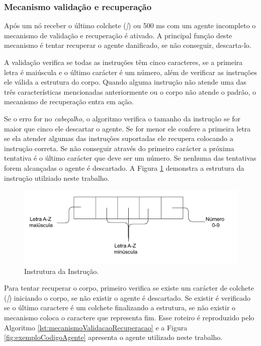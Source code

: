 \subsubsection{Mecanismo validação e recuperação}

Após um nó receber o último colchete (\emph{]}) ou 500 ms com um agente incompleto o mecanismo de validação e recuperação é ativado. A principal função deste mecanismo é tentar recuperar o agente danificado, se não conseguir, descarta-lo. 

A validação verifica se todas as instruções têm cinco caracteres, se a primeira letra é maiúscula e o último carácter é um número, além de verificar as instruções ele válida a estrutura do corpo. Quando alguma instrução não atende uma das três características mencionadas anteriormente ou o corpo não atende o padrão, o mecanismo de recuperação entra em ação. 

Se o erro for no \emph{cabeçalho}, o algoritmo verifica o tamanho da instrução se for maior que cinco ele descartar o agente. Se for menor ele confere a primeira letra se ela atender algumas das instruções suportadas ele recupera colocando a instrução correta. Se não conseguir através do primeiro carácter a próxima tentativa é o último carácter que deve ser um número. Se nenhuma das tentativas forem alcançadas o agente é descartado. A Figura \ref{fig:estruturaInstrucao} demonstra a estrutura da instrução utilziado neste trabalho.

\begin{figure}[htbp]
	\centering
	\includegraphics[scale=0.27]{metodologia/figuras/estruturaInstrucao.pdf}
	\caption{Instrutura da Instrução.}
	\label{fig:estruturaInstrucao}
\end{figure}

Para tentar recuperar o corpo, primeiro verifica se existe um carácter de colchete (\emph{[}) iniciando o corpo, se não existir o agente é descartado. Se existir é verificado se o último caractere é um colchete finalizando a estrutura, se não existir o mecanismo coloca o caractere que representa fim. Esse roteiro é reproduzido pelo Algoritmo \ref{lst:mecanismoValidacaoRecuperacao} e a Figura \ref{fig:exemploCodigoAgente} apresenta o agente utilizado neste trabalho.

